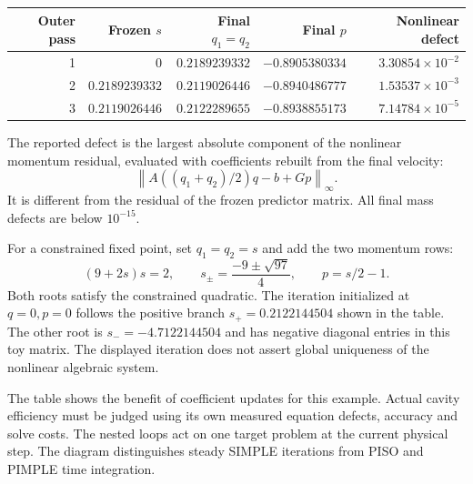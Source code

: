 \begin{center}\small\begin{tabular}{rrrrr}\toprule
Outer pass & Frozen $s$ & Final $q_1=q_2$ & Final $p$ & Nonlinear defect\\\midrule
1 & $0$ & $0.2189239332$ & $-0.8905380334$ & $3.30854\times10^{-2}$\\
2 & $0.2189239332$ & $0.2119026446$ & $-0.8940486777$ & $1.53537\times10^{-3}$\\
3 & $0.2119026446$ & $0.2122289655$ & $-0.8938855173$ & $7.14784\times10^{-5}$\\\bottomrule
\end{tabular}\end{center}
The reported defect is the largest absolute component of the nonlinear momentum residual, evaluated with coefficients rebuilt from the final velocity:
\[
\left\|A\left((q_1+q_2)/2\right)q-b+Gp\right\|_\infty.
\]
It is different from the residual of the frozen predictor matrix. All final mass defects are below $10^{-15}$.

For a constrained fixed point, set $q_1=q_2=s$ and add the two momentum rows:
\[
(9+2s)s=2,\qquad
s_{\pm}=\frac{-9\pm\sqrt{97}}4,\qquad p=s/2-1.
\]
Both roots satisfy the constrained quadratic. The iteration initialized at
$q=0,p=0$ follows the positive branch $s_+=0.2122144504$ shown in the table.
The other root is $s_-=-4.7122144504$ and has negative diagonal entries in
this toy matrix. The displayed iteration does not assert global uniqueness
of the nonlinear algebraic system.

The table shows the benefit of coefficient updates for this example. Actual cavity efficiency must be judged using its own measured equation defects, accuracy and solve costs.
\newpage
{}
The nested loops act on one target problem at the current physical step. The diagram distinguishes steady SIMPLE iterations from PISO and PIMPLE time integration.

